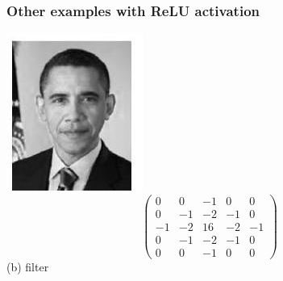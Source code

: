 \documentclass[10pt]{article}
\begin{document}
\subsubsection{Other examples with ReLU activation}
\includegraphics[max width=\textwidth]{2022_01_06_b5ce182ed1bd5f482e5bg-15}
$$
\left(\begin{array}{ccccc}
0 & 0 & -1 & 0 & 0 \\
0 & -1 & -2 & -1 & 0 \\
-1 & -2 & 16 & -2 & -1 \\
0 & -1 & -2 & -1 & 0 \\
0 & 0 & -1 & 0 & 0
\end{array}\right)
$$
(b) filter
\end{document}
